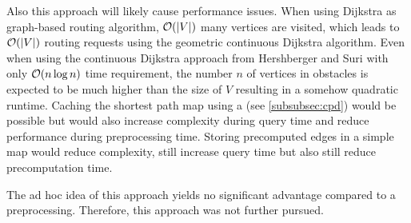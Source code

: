 		Also this approach will likely cause performance issues.
		When using Dijkstra as graph-based routing algorithm, $\mathcal{O}(|V|)$ many vertices are visited, which leads to $\mathcal{O}(|V|)$ routing requests using the geometric continuous Dijkstra algorithm.
		Even when using the continuous Dijkstra approach from Hershberger and Suri \cite{hershberger-suri} with only $\mathcal{O}(n \log n)$ time requirement, the number $n$ of vertices in obstacles is expected to be much higher than the size of $V$ resulting in a somehow quadratic runtime.
		Caching the shortest path map using a  (see \cref{subsubsec:cpd}) would be possible but would also increase complexity during query time and reduce performance during preprocessing time.
		Storing precomputed edges in a simple map would reduce complexity, still increase query time but also still reduce precomputation time.
		
		The ad hoc idea of this approach yields no significant advantage compared to a preprocessing.
		Therefore, this approach was not further pursued.
		
		
	
